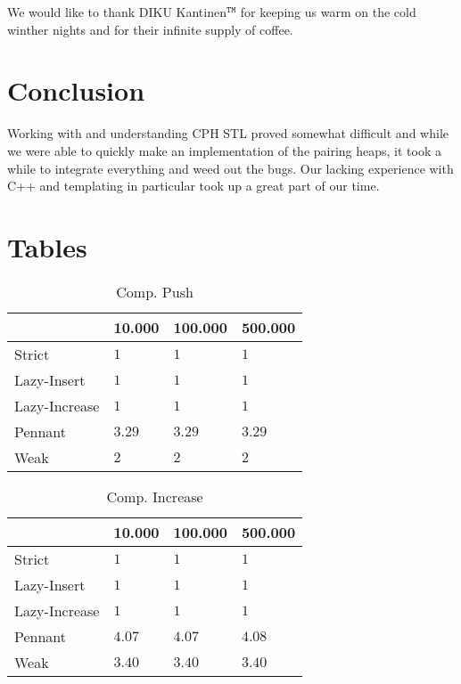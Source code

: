 \documentclass{DIKU-article}[2010/01/13]
\begin{document}
\begin{acknowledgements}
We would like to thank DIKU Kantinen$^{\mathtt{TM}}$ for keeping us
warm on the cold winther nights and for their infinite supply of coffee.
\end{acknowledgements}


\section{Conclusion}

Working with and understanding CPH STL proved somewhat difficult and
while we were able to quickly make an implementation of the pairing
heaps, it took a while to integrate everything and weed out the
bugs. Our lacking experience with C++ and templating in particular
took up a great part of our time.





\newpage
\appendix


\section{Tables}
\begin{table}[h!]
\centering
\caption{Comp. Push}
\begin{tabular}{l|lll}
\label{tab:comp.first}
 & 10.000 & 100.000 & 500.000 \\
\hline
Strict & $1$ & $1$ & $1$ \\
Lazy-Insert & $1$ & $1$ & $1$ \\
Lazy-Increase & $1$ & $1$ & $1$ \\
Pennant & $3.29$ & $3.29$ & $3.29$ \\
Weak & $2$ & $2$ & $2$

\end{tabular}
\end{table}

\begin{table}[h!]
\centering
\caption{Comp. Increase}
\begin{tabular}{l|lll}
 & 10.000 & 100.000 & 500.000 \\
\hline
Strict & $1$ & $1$ & $1$ \\
Lazy-Insert & $1$ & $1$ & $1$ \\
Lazy-Increase & $1$ & $1$ & $1$ \\
Pennant & $4.07$ & $4.07$ & $4.08$ \\
Weak & $3.40$ & $3.40$ & $3.40$

\end{tabular}
\end{table}
\end{document}
